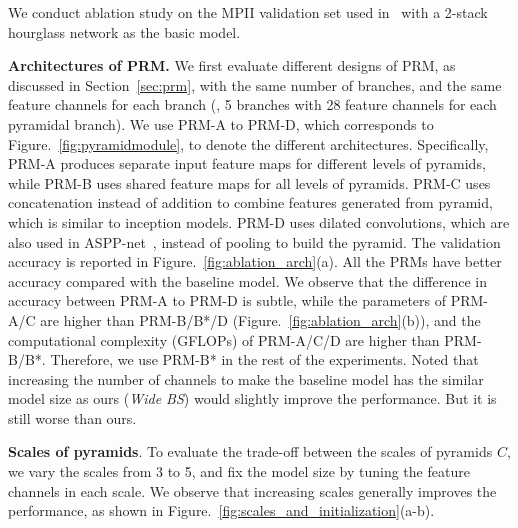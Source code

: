 \documentclass[10pt,twocolumn,letterpaper]{article}
\newcommand{\smalltitle}[1]{\vspace{0.2em}\noindent \textbf{{#1}}}
\begin{document}
We conduct ablation study on the MPII validation set used in~\cite{tompson2015efficient} with a 2-stack hourglass network as the basic model. 

\smalltitle{Architectures of PRM.} 
We first evaluate different designs of PRM, as discussed in Section~\ref{sec:prm}, with the same number of branches, and the same feature channels for each branch (\eg, 5 branches with 28 feature channels for each pyramidal branch). 
We use PRM-A to PRM-D, which corresponds to Figure.~\ref{fig:pyramidmodule}, to denote the different architectures. 
Specifically, PRM-A produces separate input feature maps for different levels of pyramids, while PRM-B uses shared feature maps for all levels of pyramids. 
PRM-C uses concatenation instead of addition to combine features generated from pyramid, which is similar to inception models. 
PRM-D uses dilated convolutions, which are also used in ASPP-net~\cite{chen2016deeplab}, instead of pooling to build the pyramid. 
The validation accuracy is reported in Figure.~\ref{fig:ablation_arch}(a). 
All the PRMs have better accuracy compared with the baseline model. 
We observe that the difference in accuracy between PRM-A to PRM-D is subtle, while the parameters of PRM-A/C are higher than PRM-B/B*/D (Figure.~\ref{fig:ablation_arch}(b)), and the computational complexity (GFLOPs) of PRM-A/C/D are higher than PRM-B/B*. 
Therefore, we use PRM-B* in the rest of the experiments. 
Noted that increasing the number of channels to make the baseline model has the similar model size as ours (\textit{Wide BS})  would slightly improve the performance. But it is still worse than ours.

\smalltitle{Scales of pyramids}. 
To evaluate the trade-off between the scales of pyramids $C$, we vary the scales from 3 to 5, and fix the model size by tuning the feature channels in each scale.  
We observe that increasing scales generally improves the performance, as shown in Figure.~\ref{fig:scales_and_initialization}(a-b). 
\end{document}
